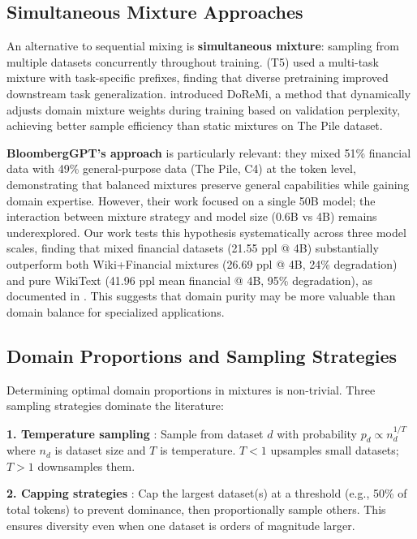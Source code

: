 \subsection{Simultaneous Mixture Approaches}

An alternative to sequential mixing is \textbf{simultaneous mixture}: sampling from multiple datasets concurrently throughout training. \textcite{raffel2020exploring} (T5) used a multi-task mixture with task-specific prefixes, finding that diverse pretraining improved downstream task generalization. \textcite{xie2023doremi} introduced DoReMi, a method that dynamically adjusts domain mixture weights during training based on validation perplexity, achieving better sample efficiency than static mixtures on The Pile dataset.

\textbf{BloombergGPT's approach} \parencite{wu2023bloomberggpt} is particularly relevant: they mixed 51\% financial data with 49\% general-purpose data (The Pile, C4) at the token level, demonstrating that balanced mixtures preserve general capabilities while gaining domain expertise. However, their work focused on a single 50B model; the interaction between mixture strategy and model size (0.6B vs 4B) remains underexplored. Our work tests this hypothesis systematically across three model scales, finding that mixed financial datasets (21.55 ppl @ 4B) substantially outperform both Wiki+Financial mixtures (26.69 ppl @ 4B, 24\% degradation) and pure WikiText (41.96 ppl mean financial @ 4B, 95\% degradation), as documented in . This suggests that domain purity may be more valuable than domain balance for specialized applications.

\subsection{Domain Proportions and Sampling Strategies}

Determining optimal domain proportions in mixtures is non-trivial. Three sampling strategies dominate the literature:

\textbf{1. Temperature sampling} \parencite{arivazhagan2019massively}: Sample from dataset $d$ with probability $p_d \propto n_d^{1/T}$ where $n_d$ is dataset size and $T$ is temperature. $T < 1$ upsamples small datasets; $T > 1$ downsamples them.

\textbf{2. Capping strategies} \parencite{longpre2023pretrainer}: Cap the largest dataset(s) at a threshold (e.g., 50\% of total tokens) to prevent dominance, then proportionally sample others. This ensures diversity even when one dataset is orders of magnitude larger.

